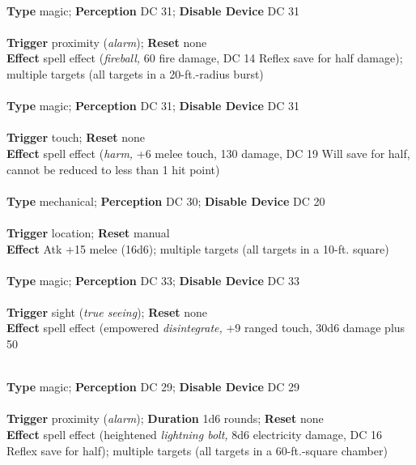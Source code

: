 \\
\textbf{Type }magic; \textbf{Perception} DC 31; \textbf{Disable Device} DC 31\\
\\
\textbf{Trigger} proximity (\textit{alarm}); \textbf{Reset} none\\
\textbf{Effect }spell effect (\textit{fireball, }60 fire damage, DC 14 Reflex save for half damage); multiple targets (all targets in a 20-ft.-radius burst)\\

\\
\textbf{Type }magic; \textbf{Perception} DC 31; \textbf{Disable Device} DC 31\\
\\
\textbf{Trigger} touch; \textbf{Reset} none\\
\textbf{Effect }spell effect (\textit{harm, }+6 melee touch, 130 damage, DC 19 Will save for half, cannot be reduced to less than 1 hit point)\\

\\
\textbf{Type }mechanical; \textbf{Perception} DC 30; \textbf{Disable Device} DC 20\\
\\
\textbf{Trigger} location; \textbf{Reset} manual\\
\textbf{Effect }Atk +15 melee (16d6); multiple targets (all targets in a 10-ft. square)\\

\\
\textbf{Type }magic; \textbf{Perception} DC 33; \textbf{Disable Device} DC 33\\
\\
\textbf{Trigger} sight (\textit{true seeing}); \textbf{Reset} none\\
\textbf{Effect }spell effect (empowered \textit{disintegrate, }+9 ranged touch, 30d6 damage plus 50%

\\
\textbf{Type }magic; \textbf{Perception} DC 29; \textbf{Disable Device} DC 29\\
\\
\textbf{Trigger} proximity (\textit{alarm}); \textbf{Duration }1d6 rounds; \textbf{Reset} none\\
\textbf{Effect }spell effect (heightened \textit{lightning bolt, }8d6 electricity damage, DC 16 Reflex save for half); multiple targets (all targets in a 60-ft.-square chamber)\\

